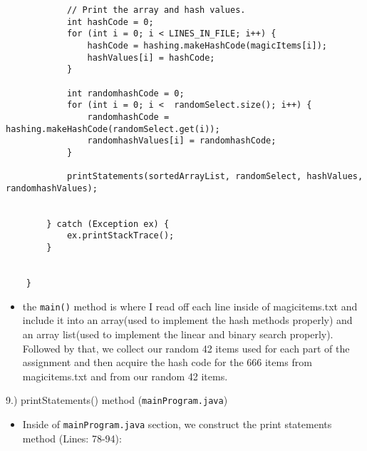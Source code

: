 \documentclass{article}
\begin{document}
\begin{verbatim}
            // Print the array and hash values.
            int hashCode = 0;
            for (int i = 0; i < LINES_IN_FILE; i++) {
                hashCode = hashing.makeHashCode(magicItems[i]);
                hashValues[i] = hashCode;
            } 
            
            int randomhashCode = 0;
            for (int i = 0; i <  randomSelect.size(); i++) {
                randomhashCode = hashing.makeHashCode(randomSelect.get(i));
                randomhashValues[i] = randomhashCode;
            } 
            
            printStatements(sortedArrayList, randomSelect, hashValues, randomhashValues);
            
            
        } catch (Exception ex) {
            ex.printStackTrace();
        }
        
        
    }
\end{verbatim}

\begin{itemize}

\item the \verb|main()| method is where I read off each line inside of magicitems.txt and include it into an array(used to implement the hash methods properly) and an array list(used to implement the linear and binary search properly). Followed by that, we collect our random 42 items used for each part of the assignment and then acquire the hash code for the 666 items from magicitems.txt and from our random 42 items.\\

\end{itemize}

\begin{large}
     9.) printStatements() method (\verb|mainProgram.java|)
\end{large}

\begin{itemize}

\item Inside of \verb|mainProgram.java| section, we construct the print statements method (Lines: 78-94):

\end{itemize}
\end{document}
